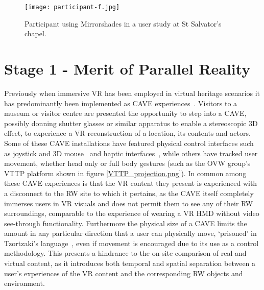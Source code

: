 
\begin{figure}
	\begin{center}
		\texttt{[image: participant-f.jpg]}
		\caption{Participant using Mirrorshades in a user study at St Salvator's chapel.}
		\label{participant-f.jpg}
	\end{center}
\end{figure}


\section{Stage 1 - Merit of Parallel Reality}

Previously when immersive VR has been employed in virtual heritage scenarios it has predominantly been implemented as CAVE experiences~\cite{Roussou2002}. Visitors to a museum or visitor centre are presented the opportunity to step into a CAVE, possibly donning shutter glasses or similar apparatus to enable a stereoscopic 3D effect, to experience a VR reconstruction of a location, its contents and actors. Some of these CAVE installations have featured physical control interfaces such as joystick and 3D mouse~\cite{cabral:x3dexperience} and haptic interfaces~\cite{Christou2006}, while others have tracked user movement, whether head only or full body  gestures (such as the OVW group's VTTP platform shown in figure \ref{VTTP_projection.png}). In common among these CAVE experiences is that the VR content they present is experienced with a disconnect to the RW site to which it pertains, as the CAVE itself completely immerses users in VR visuals and does not permit them to see any of their RW surroundings, comparable to the experience of wearing a VR HMD without video see-through functionality. Furthermore the physical size of a CAVE limits the amount in any particular direction that a user can physically move, `prisoned' in Tzortzaki's language~\cite{Tzortzaki2002}, even if movement is encouraged due to its use as a control methodology. This presents a hindrance to the on-site comparison of real and virtual content, as it introduces both temporal and spatial separation between a user's experiences of the VR content and the corresponding RW objects and environment.

